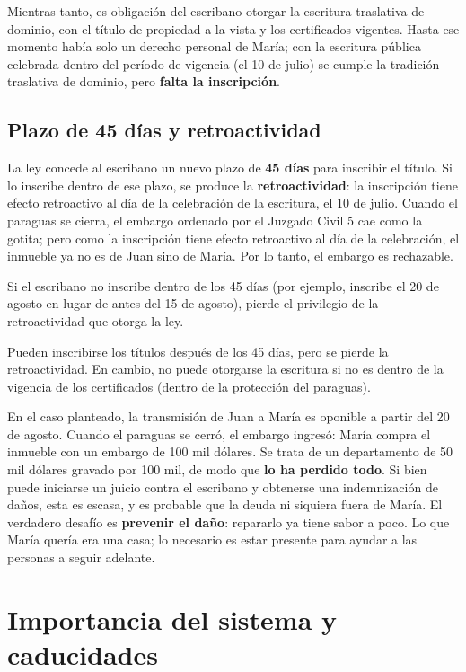 \documentclass[12pt,oneside]{book}
\begin{document}
Mientras tanto, es obligación del escribano otorgar la escritura traslativa de dominio, con el título de propiedad a la vista y los certificados vigentes. Hasta ese momento había solo un derecho personal de María; con la escritura pública celebrada dentro del período de vigencia (el 10 de julio) se cumple la tradición traslativa de dominio, pero \textbf{falta la inscripción}.

\subsection{Plazo de 45 días y retroactividad}

La ley concede al escribano un nuevo plazo de \textbf{45 días} para inscribir el título. Si lo inscribe dentro de ese plazo, se produce la \textbf{retroactividad}: la inscripción tiene efecto retroactivo al día de la celebración de la escritura, el 10 de julio. Cuando el paraguas se cierra, el embargo ordenado por el Juzgado Civil 5 cae como la gotita; pero como la inscripción tiene efecto retroactivo al día de la celebración, el inmueble ya no es de Juan sino de María. Por lo tanto, el embargo es rechazable.

Si el escribano no inscribe dentro de los 45 días (por ejemplo, inscribe el 20 de agosto en lugar de antes del 15 de agosto), pierde el privilegio de la retroactividad que otorga la ley.

\begin{important}
Pueden inscribirse los títulos después de los 45 días, pero se pierde la retroactividad. En cambio, no puede otorgarse la escritura si no es dentro de la vigencia de los certificados (dentro de la protección del paraguas).
\end{important}

En el caso planteado, la transmisión de Juan a María es oponible a partir del 20 de agosto. Cuando el paraguas se cerró, el embargo ingresó: María compra el inmueble con un embargo de 100 mil dólares. Se trata de un departamento de 50 mil dólares gravado por 100 mil, de modo que \textbf{lo ha perdido todo}. Si bien puede iniciarse un juicio contra el escribano y obtenerse una indemnización de daños, esta es escasa, y es probable que la deuda ni siquiera fuera de María. El verdadero desafío es \textbf{prevenir el daño}: repararlo ya tiene sabor a poco. Lo que María quería era una casa; lo necesario es estar presente para ayudar a las personas a seguir adelante.

\section{Importancia del sistema y caducidades}
\end{document}
